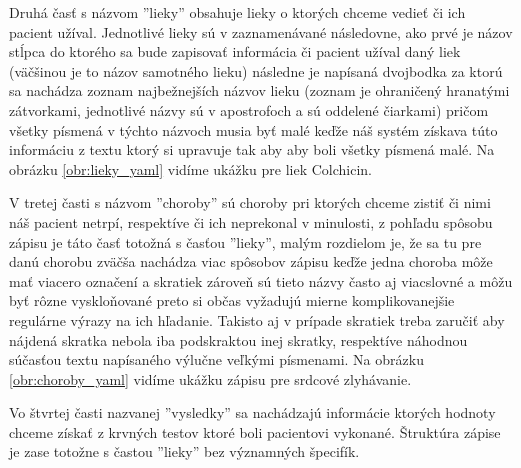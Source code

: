 Druhá časť s názvom ''lieky'' obsahuje lieky o ktorých chceme vedieť či ich pacient užíval. Jednotlivé lieky sú v zaznamenávané následovne, ako prvé je názov stĺpca do ktorého sa bude zapisovať informácia či pacient užíval daný liek (väčšinou je to názov samotného lieku) následne je napísaná dvojbodka za ktorú sa nachádza zoznam najbežnejších názvov lieku (zoznam je ohraničený hranatými zátvorkami, jednotlivé názvy sú v apostrofoch a sú oddelené čiarkami) pričom všetky písmená v týchto názvoch musia byť malé keďže náš systém získava túto informáciu z textu ktorý si upravuje tak aby aby boli všetky písmená malé. Na obrázku \ref{obr:lieky_yaml} vidíme ukážku pre liek Colchicin. 

V tretej časti s názvom ''choroby'' sú choroby pri ktorých chceme zistiť či nimi náš pacient netrpí, respektíve či ich neprekonal v minulosti, z pohľadu spôsobu zápisu je táto časť totožná s časťou ''lieky'', malým rozdielom je, že sa tu pre danú chorobu zväčša nachádza viac spôsobov zápisu keďže jedna choroba môže mať viacero označení a skratiek zároveň sú tieto názvy často aj viacslovné a môžu byť rôzne vyskloňované preto si občas vyžadujú  mierne komplikovanejšie regulárne výrazy na ich hľadanie. Takisto aj v prípade skratiek treba zaručiť aby nájdená skratka nebola iba podskraktou inej skratky, respektíve náhodnou súčasťou textu napísaného výlučne veľkými písmenami. Na obrázku \ref{obr:choroby_yaml} vidíme ukážku zápisu pre srdcové zlyhávanie.

Vo štvrtej časti nazvanej ''vysledky'' sa nachádzajú informácie ktorých hodnoty chceme získať z krvných testov ktoré boli pacientovi vykonané. Štruktúra zápise je zase totožne s častou ''lieky'' bez významných špecifík. 

